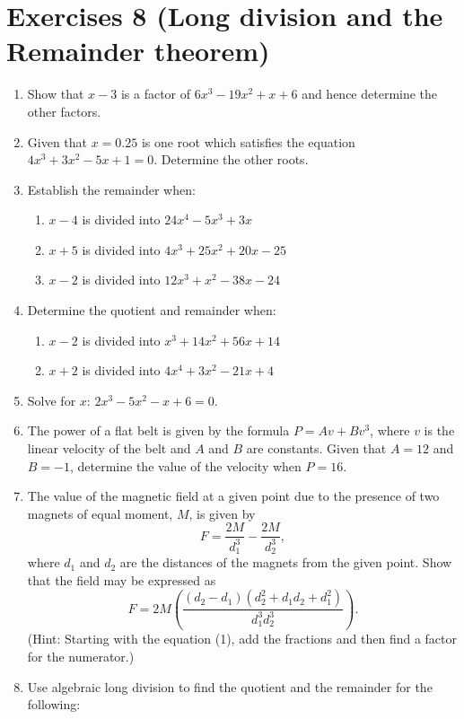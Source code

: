 \documentclass[
  12pt,
  oneside]{book}
\providecommand{\tightlist}{%
  \setlength{\itemsep}{0pt}\setlength{\parskip}{0pt}}
\theoremstyle{definition}
\theoremstyle{definition}
\theoremstyle{definition}
\theoremstyle{definition}
\theoremstyle{remark}
\begin{document}
\hypertarget{exercises-8-long-division-and-the-remainder-theorem}{%
\chapter*{Exercises 8 (Long division and the Remainder theorem)}\label{exercises-8-long-division-and-the-remainder-theorem}}

\begin{enumerate}
\def\labelenumi{\arabic{enumi}.}
\item
  Show that \(x - 3\) is a factor of \(6x^3 - 19x^2 + x + 6\) and hence determine the other factors.
\item
  Given that \(x = 0.25\) is one root which satisfies the equation \(4x^3 + 3x^2 - 5x + 1 = 0\). Determine the other roots.
\item
  Establish the remainder when:

  \begin{enumerate}
  \def\labelenumii{\roman{enumii})}
  \tightlist
  \item
    \(x - 4\) is divided into \(24x^4 - 5x^3 + 3x\)
  \item
    \(x + 5\) is divided into \(4x^3 + 25x^2 + 20x - 25\)
  \item
    \(x - 2\) is divided into \(12x^3 + x^2 - 38x - 24\)
  \end{enumerate}
\item
  Determine the quotient and remainder when:

  \begin{enumerate}
  \def\labelenumii{\roman{enumii})}
  \tightlist
  \item
    \(x - 2\) is divided into \(x^3 + 14x^2 + 56x + 14\)
  \item
    \(x + 2\) is divided into \(4x^4 + 3x^2 - 21x + 4\)
  \end{enumerate}
\item
  Solve for \(x\): \(2x^3-5x^2-x+6=0\).
\item
  The power of a flat belt is given by the formula \(P = Av + Bv^3\), where \(v\) is the linear velocity of the belt and \(A\) and \(B\) are constants. Given that \(A = 12\) and \(B = -1\), determine the value of the velocity when \(P = 16\).
\item
  The value of the magnetic field at a given point due to the presence of two magnets of equal moment, \(M\), is given by
  \[F=\frac{2M}{d_1^3}-\frac{2M}{d_2^3}, \tag{1}\]
  where \(d_1\) and \(d_2\) are the distances of the magnets from the given point. Show that the field may be expressed as
  \[F=2M\left(\frac{(d_2-d_1)(d_2^2+d_1d_2+d_1^2)}{d_1^3d_2^3}\right). \tag{2}\]
  (Hint: Starting with the equation (1), add the fractions and then find a factor for the numerator.)
\item
  Use algebraic long division to find the quotient and the remainder for the following:


\end{enumerate}
\end{document}
